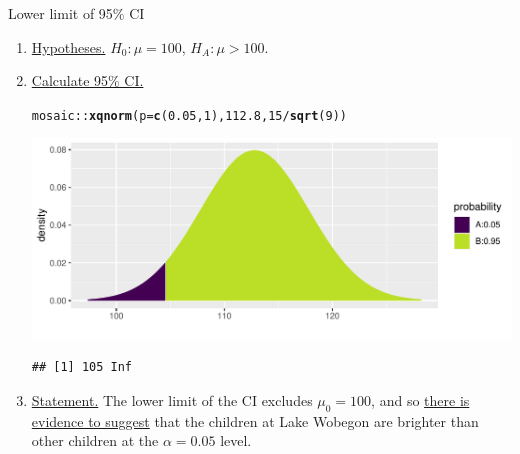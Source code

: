 \documentclass[10pt]{beamer}\usepackage[]{graphicx}\usepackage[]{color}
\makeatletter
\def\maxwidth{ %
  \ifdim\Gin@nat@width>\linewidth
    \linewidth
  \else
    \Gin@nat@width
  \fi
}
\newcommand{\hlnum}[1]{\textcolor[rgb]{0.686,0.059,0.569}{#1}}%
\newcommand{\hlopt}[1]{\textcolor[rgb]{0,0,0}{#1}}%
\newcommand{\hlstd}[1]{\textcolor[rgb]{0.345,0.345,0.345}{#1}}%
\newcommand{\hlkwc}[1]{\textcolor[rgb]{0.333,0.667,0.333}{#1}}%
\newcommand{\hlkwd}[1]{\textcolor[rgb]{0.737,0.353,0.396}{\textbf{#1}}}%
\newenvironment{kframe}{%
 \def\at@end@of@kframe{}%
 \ifinner\ifhmode%
  \def\at@end@of@kframe{\end{minipage}}%
  \begin{minipage}{\columnwidth}%
 \fi\fi%
 \def\FrameCommand##1{\hskip\@totalleftmargin \hskip-\fboxsep
 \colorbox{shadecolor}{##1}\hskip-\fboxsep
     \hskip-\linewidth \hskip-\@totalleftmargin \hskip\columnwidth}%
 \MakeFramed {\advance\hsize-\width
   \@totalleftmargin\z@ \linewidth\hsize
   \@setminipage}}%
 {\par\unskip\endMakeFramed%
 \at@end@of@kframe}
\newenvironment{knitrout}{}{} %
\makeatother
\begin{document}
\begin{frame}[fragile]{Lower limit of 95\% CI}
	\small
	\begin{enumerate}
		\item \underline{Hypotheses.} $H_0: \mu = 100$, $H_A: \mu > 100$.
		\item \underline{Calculate 95\% CI.}
\begin{knitrout}\tiny
{}\color{fgcolor}\begin{kframe}
\begin{alltt}
\hlstd{mosaic}\hlopt{::}\hlkwd{xqnorm}\hlstd{(}\hlkwc{p} \hlstd{=} \hlkwd{c}\hlstd{(}\hlnum{0.05}\hlstd{,}\hlnum{1}\hlstd{),} \hlnum{112.8}\hlstd{,} \hlnum{15}\hlopt{/}\hlkwd{sqrt}\hlstd{(}\hlnum{9}\hlstd{))}
\end{alltt}
\end{kframe}

{\centering \includegraphics[width=\maxwidth]{figure/unnamed-chunk-17-1} 

}


\begin{kframe}\begin{verbatim}
## [1] 105 Inf
\end{verbatim}
\end{kframe}
\end{knitrout}
		\pause 
		\item \underline{Statement.} The lower limit of the CI excludes $\mu_0=100$, and so \underline{there is evidence to suggest} that the children at Lake Wobegon are brighter than other children at the $\alpha=0.05$ level.
	\end{enumerate}
	
\end{frame}
\end{document}
